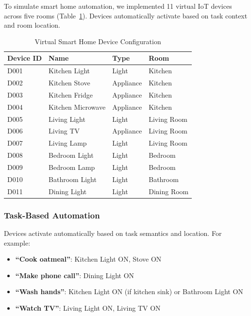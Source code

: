\documentclass[conference]{IEEEtran}
\begin{document}
To simulate smart home automation, we implemented 11 virtual IoT devices across five rooms (Table~\ref{tab:virtual_devices}). Devices automatically activate based on task context and room location.

\begin{table}[t]
\centering
\caption{Virtual Smart Home Device Configuration}
\label{tab:virtual_devices}
\begin{tabular}{@{}llll@{}}
\toprule
\textbf{Device ID} & \textbf{Name} & \textbf{Type} & \textbf{Room} \\
\midrule
D001 & Kitchen Light & Light & Kitchen \\
D002 & Kitchen Stove & Appliance & Kitchen \\
D003 & Kitchen Fridge & Appliance & Kitchen \\
D004 & Kitchen Microwave & Appliance & Kitchen \\
D005 & Living Light & Light & Living Room \\
D006 & Living TV & Appliance & Living Room \\
D007 & Living Lamp & Light & Living Room \\
D008 & Bedroom Light & Light & Bedroom \\
D009 & Bedroom Lamp & Light & Bedroom \\
D010 & Bathroom Light & Light & Bathroom \\
D011 & Dining Light & Light & Dining Room \\
\bottomrule
\end{tabular}
\end{table}

\subsubsection{Task-Based Automation}

Devices activate automatically based on task semantics and location. For example:

\begin{itemize}
    \item \textbf{``Cook oatmeal''}: Kitchen Light ON, Stove ON
    \item \textbf{``Make phone call''}: Dining Light ON
    \item \textbf{``Wash hands''}: Kitchen Light ON (if kitchen sink) or Bathroom Light ON
    \item \textbf{``Watch TV''}: Living Light ON, Living TV ON
\end{itemize}
\end{document}
